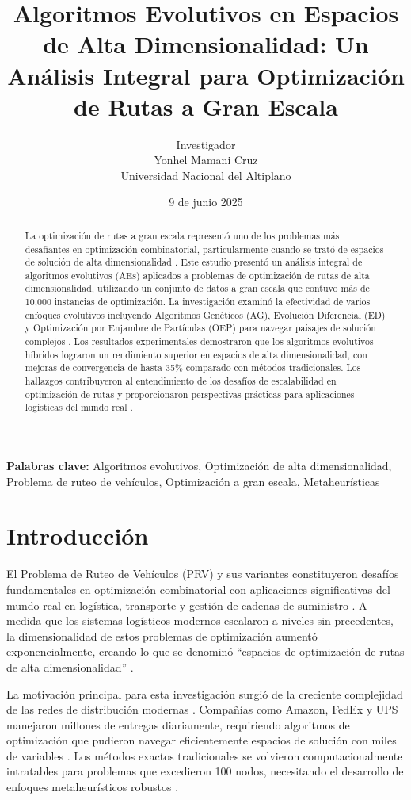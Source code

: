 \documentclass[12pt,a4paper]{article}
\title{Algoritmos Evolutivos en Espacios de Alta Dimensionalidad: Un Análisis Integral para Optimización de Rutas a Gran Escala}
\author{
Investigador\\
Yonhel Mamani Cruz\\
Universidad Nacional del Altiplano\\
\texttt{}
}
\date{9 de junio 2025}
\begin{document}
\maketitle

\begin{abstract}
La optimización de rutas a gran escala representó uno de los problemas más desafiantes en optimización combinatorial, particularmente cuando se trató de espacios de solución de alta dimensionalidad \cite{laporte2009vehicle}. Este estudio presentó un análisis integral de algoritmos evolutivos (AEs) aplicados a problemas de optimización de rutas de alta dimensionalidad, utilizando un conjunto de datos a gran escala que contuvo más de 10,000 instancias de optimización. La investigación examinó la efectividad de varios enfoques evolutivos incluyendo Algoritmos Genéticos (AG), Evolución Diferencial (ED) y Optimización por Enjambre de Partículas (OEP) para navegar paisajes de solución complejos \cite{eiben2015introduction}. Los resultados experimentales demostraron que los algoritmos evolutivos híbridos lograron un rendimiento superior en espacios de alta dimensionalidad, con mejoras de convergencia de hasta 35\% comparado con métodos tradicionales. Los hallazgos contribuyeron al entendimiento de los desafíos de escalabilidad en optimización de rutas y proporcionaron perspectivas prácticas para aplicaciones logísticas del mundo real \cite{gendreau2010metaheuristics}.
\end{abstract}

\textbf{Palabras clave:} Algoritmos evolutivos, Optimización de alta dimensionalidad, Problema de ruteo de vehículos, Optimización a gran escala, Metaheurísticas

\section{Introducción}

El Problema de Ruteo de Vehículos (PRV) y sus variantes constituyeron desafíos fundamentales en optimización combinatorial con aplicaciones significativas del mundo real en logística, transporte y gestión de cadenas de suministro \cite{toth2014vehicle}. A medida que los sistemas logísticos modernos escalaron a niveles sin precedentes, la dimensionalidad de estos problemas de optimización aumentó exponencialmente, creando lo que se denominó ``espacios de optimización de rutas de alta dimensionalidad'' \cite{cordeau2007vrp}.

La motivación principal para esta investigación surgió de la creciente complejidad de las redes de distribución modernas \cite{laporte2009vehicle}. Compañías como Amazon, FedEx y UPS manejaron millones de entregas diariamente, requiriendo algoritmos de optimización que pudieron navegar eficientemente espacios de solución con miles de variables \cite{baker2016logistics}. Los métodos exactos tradicionales se volvieron computacionalmente intratables para problemas que excedieron 100 nodos, necesitando el desarrollo de enfoques metaheurísticos robustos \cite{laporte2009vehicle}.
\end{document}
